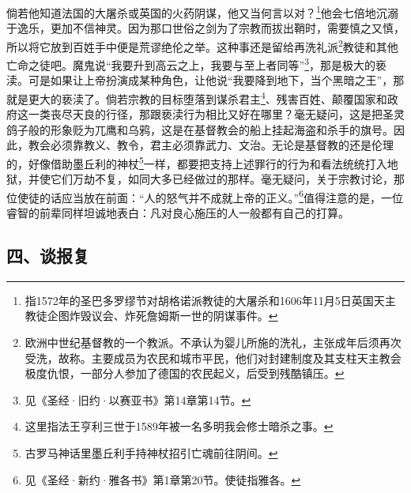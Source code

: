 \par 倘若他知道法国的大屠杀或英国的火药阴谋，他又当何言以对？\footnote{指1572年的圣巴多罗缪节对胡格诺派教徒的大屠杀和1606年11月5日英国天主教徒企图炸毁议会、炸死詹姆斯一世的阴谋事件。}他会七倍地沉溺于逸乐，更加不信神灵。因为那口世俗之剑为了宗教而拔出鞘时，需要慎之又慎，所以将它放到百姓手中便是荒谬绝伦之举。这种事还是留给再洗礼派\footnote{欧洲中世纪基督教的一个教派。不承认为婴儿所施的洗礼，主张成年后须再次受洗，故称。主要成员为农民和城市平民，他们对封建制度及其支柱天主教会极度仇恨，一部分人参加了德国的农民起义，后受到残酷镇压。}教徒和其他亡命之徒吧。魔鬼说“我要升到高云之上，我要与至上者同等”\footnote{见《圣经·旧约·以赛亚书》第14章第14节。}，那是极大的亵渎。可是如果让上帝扮演成某种角色，让他说“我要降到地下，当个黑暗之王”，那就是更大的亵渎了。倘若宗教的目标堕落到谋杀君主\footnote{这里指法王亨利三世于1589年被一名多明我会修士暗杀之事。}、残害百姓、颠覆国家和政府这一类丧尽天良的行径，那跟亵渎行为相比又好在哪里？毫无疑问，这是把圣灵鸽子般的形象贬为兀鹰和乌鸦，这是在基督教会的船上挂起海盗和杀手的旗号。因此，教会必须靠教义、教令，君主必须靠武力、文治。无论是基督教的还是伦理的，好像借助墨丘利的神杖\footnote{古罗马神话里墨丘利手持神杖招引亡魂前往阴间。}一样，都要把支持上述罪行的行为和看法统统打入地狱，并使它们万劫不复，如同大多已经做过的那样。毫无疑问，关于宗教讨论，那位使徒的话应当放在前面：“人的怒气并不成就上帝的正义。”\footnote{见《圣经·新约·雅各书》第1章第20节。使徒指雅各。}值得注意的是，一位睿智的前辈同样坦诚地表白：凡对良心施压的人一般都有自己的打算。




\subsection*{四、谈报复}


